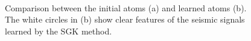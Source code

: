 {\begin{figure}[htb!]
\centering
{}\\
\caption{Comparison between the initial atoms (a) and learned atoms (b). The white circles in (b) show clear features of the seismic signals learned by the SGK method.}
\label{fig:atoms1,atoms2}
\end{figure}

}
